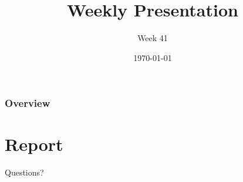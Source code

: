 \documentclass{beamer}
\title{Weekly Presentation}
\subtitle{Week 41}
\author{}
\institute{Luleå University of Technology}
\date{\today}
\begin{document}
\begin{frame}
    \titlepage
\end{frame}

\begin{frame}
    \frametitle{Overview}
    \tableofcontents
\end{frame}

\section{Report}





\begin{frame}
    \begin{center}
        \Huge Questions?
    \end{center}
\end{frame}
\end{document}
